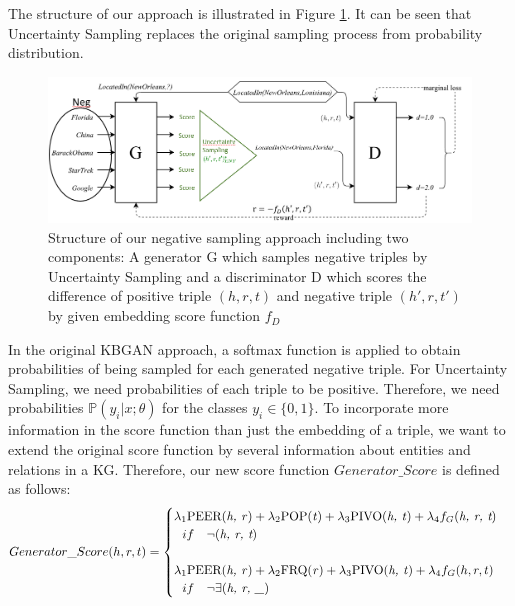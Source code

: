 The structure of our approach is illustrated in Figure \ref{fig:architecture}.
It can be seen that Uncertainty Sampling replaces the original sampling process from probability distribution.
\begin{figure}
    \centering
    \includegraphics[width=\textwidth]{figures/architecture.png}
    \caption{Structure of our negative sampling approach including two components:
    A generator G which samples negative triples by Uncertainty Sampling and a discriminator D which scores the difference of positive triple $(h,r,t)$ and negative triple $(h',r,t')$ by given embedding score function $f_D$}
    \label{fig:architecture}
\end{figure}
In the original \ac{KBGAN} approach, a softmax function is applied to obtain probabilities of being sampled for each generated negative triple.
For Uncertainty Sampling, we need probabilities of each triple to be positive. 
Therefore, we need probabilities $\mathds{P}(y_i | x; \theta)$ for the classes $y_i \in \{0, 1\}$.
To incorporate more information in the score function than just the embedding of a triple, we want to extend the original score function by several information about entities and relations in a \ac{KG}.
Therefore, our new score function $Generator\_Score$ is defined as follows:
\begin{equation}
    Generator\_Score(h, r, t)=
    \begin{cases}
         \lambda_1 \text{PEER(\textit{h, r})} + \lambda_2 \text{POP(\textit{t})} + \lambda_3 \text{PIVO(\textit{h, t})} + \lambda_4 f_G(\textit{h, r, t})
         \\ \ \ 
         if\ \ \ \neg(\textit{h, r, t})
         \\ \\
         \lambda_1 \text{PEER(\textit{h, r})} + \lambda_2 \text{FRQ(\textit{r})} + \lambda_3 \text{PIVO(\textit{h, t})} + \lambda_4 f_G(h, r, t)
         \\ \ \ 
         if\ \ \ \neg \exists (\textit{h, r, \_})
         \\
    \end{cases}
\end{equation}
